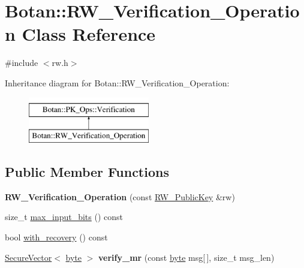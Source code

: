\hypertarget{classBotan_1_1RW__Verification__Operation}{\section{Botan\-:\-:R\-W\-\_\-\-Verification\-\_\-\-Operation Class Reference}
\label{classBotan_1_1RW__Verification__Operation}
}


{\ttfamily \#include $<$rw.\-h$>$}

Inheritance diagram for Botan\-:\-:R\-W\-\_\-\-Verification\-\_\-\-Operation\-:\begin{figure}[H]
\begin{center}
\leavevmode
\includegraphics[height=2.000000cm]{classBotan_1_1RW__Verification__Operation}
\end{center}
\end{figure}
\subsection*{Public Member Functions}
\begin{DoxyCompactItemize}
\item 
\hypertarget{classBotan_1_1RW__Verification__Operation_abf429b3bd94c3d6654a0de2372a1826a}{{\bfseries R\-W\-\_\-\-Verification\-\_\-\-Operation} (const \hyperlink{classBotan_1_1RW__PublicKey}{R\-W\-\_\-\-Public\-Key} \&rw)}\label{classBotan_1_1RW__Verification__Operation_abf429b3bd94c3d6654a0de2372a1826a}

\item 
size\-\_\-t \hyperlink{classBotan_1_1RW__Verification__Operation_a9919bda595f3be6a344ca028675986c8}{max\-\_\-input\-\_\-bits} () const 
\item 
bool \hyperlink{classBotan_1_1RW__Verification__Operation_a69cc5becd49383d478c4e3043bcfdc98}{with\-\_\-recovery} () const 
\item 
\hypertarget{classBotan_1_1RW__Verification__Operation_ac42a6056d7570047ab1e1fdfe82fd487}{\hyperlink{classBotan_1_1SecureVector}{Secure\-Vector}$<$ \hyperlink{namespaceBotan_a7d793989d801281df48c6b19616b8b84}{byte} $>$ {\bfseries verify\-\_\-mr} (const \hyperlink{namespaceBotan_a7d793989d801281df48c6b19616b8b84}{byte} msg\mbox{[}$\,$\mbox{]}, size\-\_\-t msg\-\_\-len)}\label{classBotan_1_1RW__Verification__Operation_ac42a6056d7570047ab1e1fdfe82fd487}

\end{DoxyCompactItemize}


